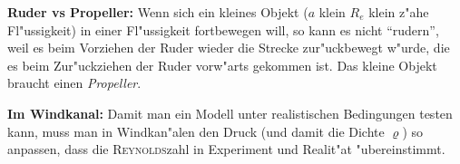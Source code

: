 \begin{Beispiel}
   \textbf{Ruder vs Propeller:} Wenn sich ein kleines Objekt ($a$
   klein \Impl $R_e$ klein \Impl z"ahe Fl"ussigkeit) in einer
   Fl"ussigkeit fortbewegen will, so kann es nicht "`rudern"', weil es
   beim Vorziehen der Ruder wieder die Strecke zur"uckbewegt w"urde,
   die es beim Zur"uckziehen der Ruder vorw"arts gekommen ist. Das
   kleine Objekt braucht einen \emph{Propeller}.

   \textbf{Im Windkanal:} Damit man ein Modell unter realistischen
   Bedingungen testen kann, muss man in Windkan"alen den Druck (und
   damit die Dichte $\varrho$) so anpassen, dass die
   \textsc{Reynolds}zahl in Experiment und Realit"at "ubereinstimmt.
\end{Beispiel}






























